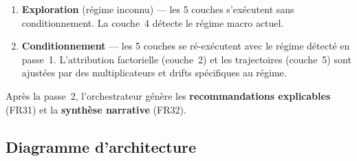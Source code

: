 \documentclass[12pt,a4paper]{article}
\begin{document}
\begin{definitionbox}
\begin{enumerate}[label=\textbf{Passe \arabic*},leftmargin=2.5cm]
    \item \textbf{Exploration} (r\'egime inconnu) --- les 5 couches s'ex\'ecutent sans
          conditionnement. La couche~4 d\'etecte le r\'egime macro actuel.
    \item \textbf{Conditionnement} --- les 5 couches se r\'e-ex\'ecutent avec le r\'egime
          d\'etect\'e en passe~1. L'attribution factorielle (couche~2) et les trajectoires
          (couche~5) sont ajust\'ees par des multiplicateurs et drifts sp\'ecifiques au
          r\'egime.
\end{enumerate}
Apr\`es la passe~2, l'orchestrateur g\'en\`ere les \textbf{recommandations explicables}
(FR31) et la \textbf{synth\`ese narrative} (FR32).
\end{definitionbox}

\subsection{Diagramme d'architecture}
\end{document}
